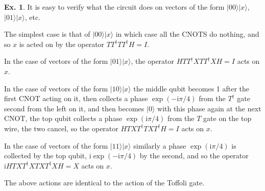 \documentclass[a4paper,12pt]{article}
\def\imagi{\mathrm{i}}
\theoremstyle{definition}
\newtheorem{exercise}{Ex.}[section]
\begin{document}
\begin{exercise}
 It is easy to verify what the circuit does on vectors of the form $|00\rangle |x\rangle$, $|01\rangle |x\rangle$, etc.
 
 The simplest case is that of $|00\rangle |x\rangle$ in which case all the CNOTS do nothing, and so $x$ is acted on by the operator $TT^\dagger TT^\dagger H = I$.
 
 In the case of vectors of the form $|01\rangle|x\rangle$, the operator $HTT^\dagger XTT^\dagger X H = I$ acts on $x$.
 
 In the case of vectors of the form $|10\rangle |x\rangle$ the middle qubit becomes 1 after the first CNOT acting on it, then collects a phase $\exp(-\imagi \pi/4)$ from the $T^\dagger$ gate second from the left on it, and then becomes $|0\rangle$ with this phase again at the next CNOT, the top qubit collects a phase $\exp(\imagi \pi/4)$ from the $T$ gate on the top wire, the two cancel, so the operator $HTXT^\dagger TXT^\dagger H=I$ acts on $x$.
 
 In the case of vectors of the form $|11\rangle |x\rangle$ similarly a phase $\exp(\imagi\pi/4)$ is collected by the top qubit, $\imagi \exp(-\imagi\pi/4)$ by the second, and so the operator $\imagi HTXT^\dagger XTXT^\dagger XH = X$ acts on $x$.
 
 The above actions are identical to the action of the Toffoli gate.
\end{exercise}
\end{document}
